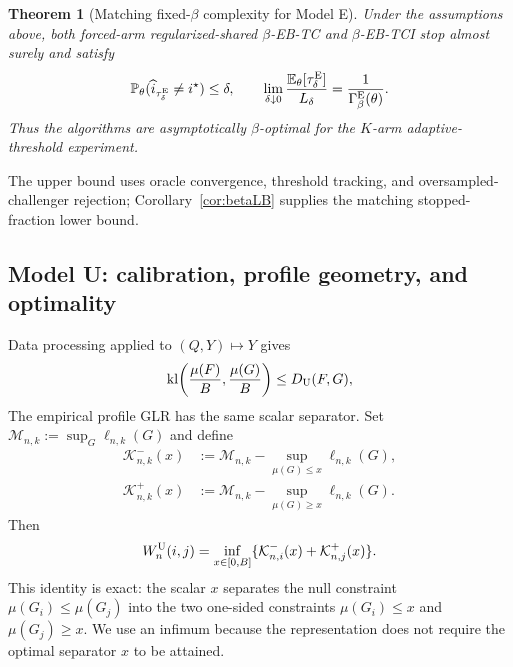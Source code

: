 \documentclass[twoside]{article}
\newtheorem{theorem}{Theorem}
\theoremstyle{definition}
\newcommand{\Pp}{\mathbb P}
\newcommand{\E}{\mathbb E}
\newcommand{\kl}{\operatorname{kl}}
\newcommand{\1}{\mathbf 1}
\newcommand{\GammaE}{\Gamma_{\beta}^{\mathrm E}}
\newcommand{\Ldelta}{L_\delta}
\begin{document}
\begin{theorem}[Matching fixed-$\beta$ complexity for Model E]
\label{thm:Emain}
Under the assumptions above, both forced-arm regularized-shared $\beta$-EB-TC and $\beta$-EB-TCI stop almost surely and satisfy
\begin{equation}
\Pp_\theta(\widehat i_{\tau_\delta^{\rm E}}\ne i^\star)\le\delta,
\qquad
\lim_{\delta\downarrow0}
\frac{\E_\theta[\tau_\delta^{\rm E}]}{\Ldelta}
=\frac1{\GammaE(\theta)}.
\label{eq:Emain}
\end{equation}
Thus the algorithms are asymptotically $\beta$-optimal for the $K$-arm adaptive-threshold experiment.
\end{theorem}

The upper bound uses oracle convergence, threshold tracking, and
oversampled-challenger rejection; Corollary~\ref{cor:betaLB} supplies the
matching stopped-fraction lower bound.

\subsection{Model U: calibration, profile geometry, and optimality}
Data processing applied to $(Q,Y)\mapsto Y$ gives
\begin{equation}
\kl\!\left(\frac{\mu(F)}B,\frac{\mu(G)}B\right)\le D_{\rm U}(F,G),
\label{eq:Udataprocessing}
\end{equation}
The empirical profile GLR has the same scalar separator.  Set
$\mathcal M_{n,k}:=\sup_G\ell_{n,k}(G)$ and define
\begin{align*}
\mathcal K_{n,k}^-(x)
&:=\mathcal M_{n,k}-\sup_{\mu(G)\le x}\ell_{n,k}(G),\\
\mathcal K_{n,k}^+(x)
&:=\mathcal M_{n,k}-\sup_{\mu(G)\ge x}\ell_{n,k}(G).
\end{align*}
Then
\begin{equation}
W_n^{\rm U}(i,j)=\inf_{x\in[0,B]}
\{\mathcal K_{n,i}^-(x)+\mathcal K_{n,j}^+(x)\}.
\label{eq:Useparator-emp}
\end{equation}
This identity is exact: the scalar $x$ separates the null constraint
$\mu(G_i)\le\mu(G_j)$ into the two one-sided constraints $\mu(G_i)\le x$
and $\mu(G_j)\ge x$.  We use an infimum because the representation does not
require the optimal separator $x$ to be attained.
\end{document}
